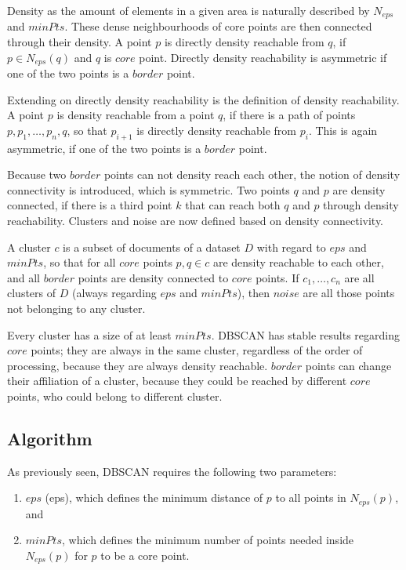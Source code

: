 Density as the amount of elements in a given area is naturally described by $N_{eps}$ and $minPts$. These dense neighbourhoods of core points are then connected through their density. A point $p$ is directly density reachable from $q$, if $p \in N_{eps}(q)$ and $q$ is $core$ point. Directly density reachability is asymmetric if one of the two points is a $border$ point.

Extending on directly density reachability is the definition of density reachability. A point $p$ is density reachable from a point $q$, if there is a path of points $p, p_1, \dots, p_n, q$, so that $p_{i+1}$ is directly density reachable from $p_i$. This is again asymmetric, if one of the two points is a $border$ point.

Because two $border$ points can not density reach each other, the notion of density connectivity is introduced, which is symmetric. Two points $q$ and $p$ are density connected, if there is a third point $k$ that can reach both $q$ and $p$ through density reachability. Clusters and noise are now defined based on density connectivity. 

A cluster $c$ is a subset of documents of a dataset $D$ with regard to $eps$ and $minPts$, so that for all $core$ points $p, q \in c$ are density reachable to each other, and all $border$ points are density connected to $core$ points. If $c_1, \dots, c_n$ are all clusters of $D$ (always regarding $eps$ and $minPts$), then $noise$ are all those points not belonging to any cluster.

Every cluster has a size of at least $minPts$. DBSCAN has stable results regarding $core$ points; they are always in the same cluster, regardless of the order of processing, because they are always density reachable. $border$ points can change their affiliation of a cluster, because they could be reached by different $core$ points, who could belong to different cluster.

\newpage
\subsection{Algorithm}
As previously seen, DBSCAN requires the following two parameters:

\begin{enumerate}
\item $eps$ (eps), which defines the minimum distance of $p$ to all points in $N_{eps}(p)$, and
\item $minPts$, which defines the minimum number of points needed inside $N_{eps}(p)$ for $p$ to be a core point.
\end{enumerate}

